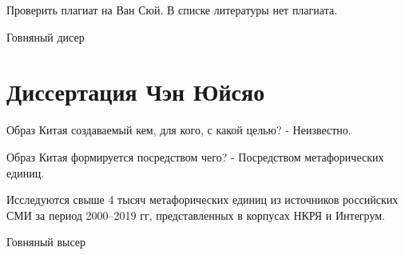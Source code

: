 \documentclass[11pt]{article}
\begin{document}
Проверить плагиат на Ван Сюй.
В списке литературы нет плагиата.

Говняный дисер


\section{Диссертация Чэн Юйсяо}\label{sec:section-chengyuxiao}

Образ Китая создаваемый кем, для кого, с какой целью?
- Неизвестно.

Образ Китая формируется посредством чего?
- Посредством метафорических единиц.

Исследуются свыше 4 тысяч метафорических единиц из источников российских СМИ за период 2000--2019 гг, представленных в корпусах НКРЯ и Интегрум.

Говняный высер

    
    
\end{document}
